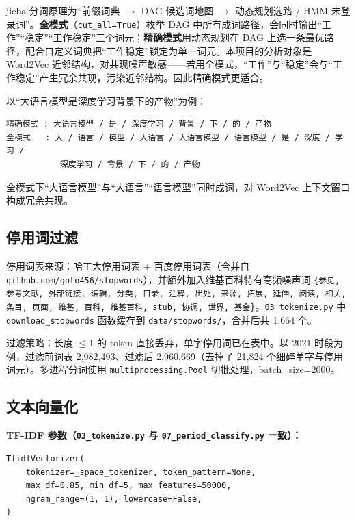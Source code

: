 \documentclass[12pt,a4paper]{article}
\begin{document}
jieba 分词原理为“前缀词典 $\rightarrow$ DAG 候选词地图 $\rightarrow$ 动态规划选路 / HMM 未登录词”。\textbf{全模式}（\texttt{cut\_all=True}）枚举 DAG 中所有成词路径，会同时输出“工作”“稳定”“工作稳定”三个词元；\textbf{精确模式}用动态规划在 DAG 上选一条最优路径，配合自定义词典把“工作稳定”锁定为单一词元。本项目的分析对象是 Word2Vec 近邻结构，对共现噪声敏感——若用全模式，“工作”与“稳定”会与“工作稳定”产生冗余共现，污染近邻结构。因此精确模式更适合。

以“大语言模型是深度学习背景下的产物”为例：

\begin{lstlisting}[basicstyle=\ttfamily\scriptsize]
精确模式 : 大语言模型 / 是 / 深度学习 / 背景 / 下 / 的 / 产物
全模式   : 大 / 语言 / 模型 / 大语言 / 大语言模型 / 语言模型 / 是 / 深度 / 学习 /
           深度学习 / 背景 / 下 / 的 / 产物
\end{lstlisting}

全模式下“大语言模型”与“大语言”“语言模型”同时成词，对 Word2Vec 上下文窗口构成冗余共现。

\subsection{停用词过滤}

停用词表来源：哈工大停用词表 + 百度停用词表（合并自 \texttt{github.com/goto456/stopwords}），并额外加入维基百科特有高频噪声词 \texttt{\{参见, 参考文献, 外部链接, 编辑, 分类, 目录, 注释, 出处, 来源, 拓展, 延伸, 阅读, 相关, 条目, 页面, 维基, 百科, 维基百科, stub, 协调, 世界, 基金\}}。\texttt{03\_tokenize.py} 中 \texttt{download\_stopwords} 函数缓存到 \texttt{data/stopwords/}，合并后共 1,664 个。

过滤策略：长度 $\leq 1$ 的 token 直接丢弃，单字停用词已在表中。以 2021 时段为例，过滤前词表 2,982,493、过滤后 2,960,669（去掉了 21,824 个细碎单字与停用词元）。多进程分词使用 \texttt{multiprocessing.Pool} 切批处理，batch\_size=2000。

\subsection{文本向量化}

\textbf{TF-IDF 参数（\texttt{03\_tokenize.py} 与 \texttt{07\_period\_classify.py} 一致）：}

\begin{lstlisting}
TfidfVectorizer(
    tokenizer=_space_tokenizer, token_pattern=None,
    max_df=0.85, min_df=5, max_features=50000,
    ngram_range=(1, 1), lowercase=False,
)
\end{lstlisting}
\end{document}
